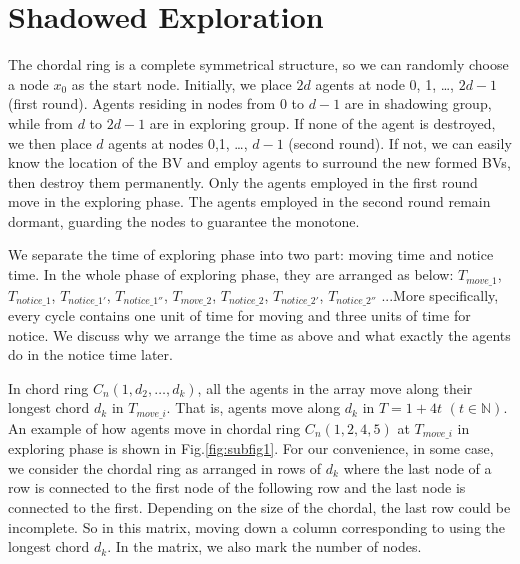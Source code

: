 \section{Shadowed Exploration}
The chordal ring is a complete symmetrical structure, so we can randomly choose a node $x_0$ as the start node. Initially, we place $2d$ agents at node 0, 1, \ldots , $2d-1$ (first round). Agents residing in nodes from $0$ to $d-1$ are in shadowing group, while from $d$ to $2d-1$ are in exploring group. If none of the agent is destroyed, we then place $d$ agents at nodes 0,1, \ldots, $d-1$ (second round). If not, we can easily know the location of the BV and employ agents to surround the new formed BVs, then destroy them permanently. Only the agents employed in the first round move in the exploring phase. The agents employed in the second round remain dormant, guarding the nodes to guarantee the monotone. 

We separate the time of exploring phase into two part: moving time and notice time. In the whole phase of exploring phase, they are arranged as below: $T_{move\_1}$, $T_{notice\_1}$, $T_{notice\_1'}$, $T_{notice\_1''}$, $T_{move\_2}$, $T_{notice\_2}$, $T_{notice\_2'}$, $T_{notice\_2''}$ ...More specifically, every cycle contains one unit of time for moving and three units of time for notice. We discuss why we arrange the time as above and what exactly the agents do in the notice time later. 

In chord ring $C_n(1, d_2, \ldots, d_k)$, all the agents in the array move along their longest chord $d_k$ in $T_{move\_i}$. That is, agents move along $d_k$ in $T=1+4t$ $(t\in \mathbb{N})$.  An example of how agents move in chordal ring $C_n(1, 2 , 4, 5)$ at $T_{move\_i}$ in exploring phase is shown in Fig.\ref{fig:subfig1}. For our convenience, in some case, we consider the chordal ring as arranged in rows of $d_k$ where the last node of a row is connected to the first node of the following row and the last node is connected to the first. Depending on the size of the chordal, the last row could be incomplete. So in this matrix, moving down a column corresponding to using the longest chord $d_k$. In the matrix, we also mark the number of nodes.\\

